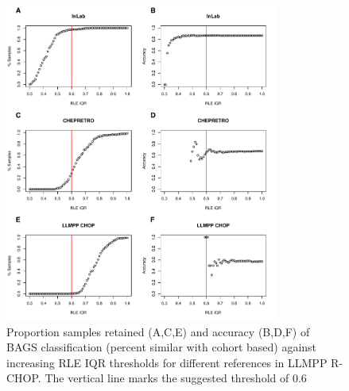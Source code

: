 \documentclass{article}
\begin{document}
\begin{figure}
	\begin{center}
		\includegraphics[width=0.8\textwidth]{figures/RCHOP_rle_classification_bags.pdf}
	\end{center}
	\caption{Proportion samples retained (A,C,E) and accuracy (B,D,F) of BAGS classification (percent similar with cohort based) against increasing RLE IQR thresholds for different references in LLMPP R-CHOP. The vertical line marks the suggested threshold of 0.6}
	\label{fig:RCHOP_rle_clas_bags}
\end{figure}
\end{document}

